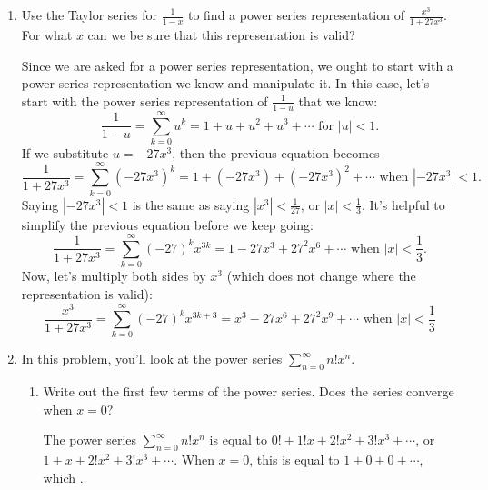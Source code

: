 \documentclass[main]{subfiles}
\begin{document}
\begin{enumerate}

\item 
\begin{problem}[2.5in]
Use the Taylor series for $\frac{1}{1-x}$ to find a power series representation of $\displaystyle \frac{x^3}{1+27
x^3}$.  For what $x$ can we be sure that this representation is
valid?
\end{problem}

\begin{solution}
Since we are asked for a power series representation, we ought to
start with a power series representation we know and manipulate it.
In this case, let's start with the power series representation of
$\frac{1}{1 - u}$ that we know:
\[ \frac{1}{1 - u} = \sum_{k=0}^\infty u^k = 1 + u + u^2 + u^3 +
\cdots \textrm{ for } |u| < 1.\] If we substitute $u = -27 x^3$,
then the previous equation becomes
\[ \frac{1}{1 + 27x^3} = \sum_{k=0}^\infty (-27x^3)^k = 1 + (-27x^3) +
(-27x^3)^2 + \cdots \textrm{ when } |-27x^3| < 1.\] Saying $|-27 x^3|
< 1$ is the same as saying $\left| x^3 \right| < \frac{1}{27}$, or
$|x| < \frac{1}{3}$.  It's helpful to simplify the previous equation
before we keep going:
\[ \frac{1}{1 + 27x^3} = \sum_{k=0}^\infty (-27)^k x^{3k} = 1 - 27x^3
+ 27^2 x^6 + \cdots \textrm{ when } |x| < \frac{1}{3}.\] Now, let's
multiply both sides by $x^3$ (which does not change where the
representation is valid):
\[ \boxed{\frac{x^3}{1 + 27x^3} = \sum_{k=0}^\infty (-27)^k x^{3k + 3} =
x^3 - 27x^6 + 27^2 x^9 + \cdots \textrm{ when } |x| < \frac{1}{3}}\]
\end{solution}


\iffalse
\item 
{}

In this problem, you'll look at the power series $\displaystyle
\sum_{n=0}^\infty n! x^n$.

\begin{enumerate}
  \item
  \begin{problem}[0.35in]
  Write out the first few terms of the power series.  Does the series
  converge when $x = 0$?
  \end{problem}

  \begin{solution}
  The power series $\displaystyle \sum_{n=0}^\infty n! x^n$ is equal
  to $0! + 1! x + 2! x^2 + 3! x^3 + \cdots$, or $\boxed{1 + x + 2! x^2
  + 3!  x^3 + \cdots}$.  When $x = 0$, this is equal to $1 + 0 + 0 +
  \cdots$, which .
  \end{solution}



\end{enumerate}
\end{enumerate}
\end{document}
